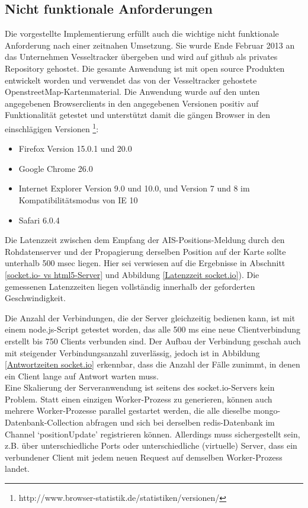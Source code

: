 \subsection{Nicht funktionale Anforderungen}
Die vorgestellte Implementierung erfüllt auch die wichtige nicht funktionale Anforderung nach einer zeitnahen Umsetzung. Sie wurde Ende Februar 2013 an das Unternehmen Vesseltracker übergeben und wird auf github als privates Repository gehostet.
Die gesamte Anwendung ist mit open source Produkten entwickelt worden und verwendet das von der Vesseltracker gehostete OpenstreetMap-Kartenmaterial.\newline
Die Anwendung wurde auf den unten angegebenen Browserclients in den angegebenen Versionen positiv auf Funktionalität getestet und unterstützt damit die gängen Browser in den einschlägigen Versionen \footnote{http://www.browser-statistik.de/statistiken/versionen/}:
\begin{itemize}
\item Firefox Version 15.0.1 und 20.0
\item Google Chrome 26.0
\item Internet Explorer Version 9.0 und 10.0, und Version 7 und 8 im Kompatibilitätsmodus von IE 10
\item Safari 6.0.4
\end {itemize}

Die Latenzzeit zwischen dem Empfang der AIS-Positions-Meldung durch den Rohdatenserver und der Propagierung derselben Position auf der Karte sollte unterhalb 500 msec liegen. Hier sei verwiesen auf die Ergebnisse in Abschnitt \ref{socket.io- vs html5-Server} und Abbildung \ref{Latenzzeit socket.io}). Die gemessenen Latenzzeiten liegen vollständig innerhalb der geforderten Geschwindigkeit.


Die Anzahl der Verbindungen, die der Server gleichzeitig bedienen kann, ist mit einem node.js-Script getestet worden, das alle 500 ms eine neue Clientverbindung erstellt bis 750 Clients verbunden sind. Der Aufbau der Verbindung geschah auch mit steigender Verbindungsanzahl zuverlässig, jedoch ist in Abbildung \ref{Antwortzeiten socket.io} erkennbar, dass die Anzahl der Fälle zunimmt, in denen ein Client lange auf Antwort warten muss.
\\Eine Skalierung der Serveranwendung ist seitens des socket.io-Servers kein Problem. Statt einen einzigen Worker-Prozess zu generieren, können auch mehrere Worker-Prozesse parallel gestartet werden, die alle dieselbe mongo-Datenbank-Collection abfragen und sich bei derselben redis-Datenbank im Channel ‘positionUpdate’ registrieren können. Allerdings muss sichergestellt sein, z.B.  über unterschiedliche Ports oder unterschiedliche (virtuelle) Server, dass ein verbundener Client mit jedem neuen Request auf demselben Worker-Prozess landet.

